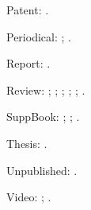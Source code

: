 \documentclass[a4paper,12pt]{report}
\begin{document}
Patent: \autocite{petroff:impurity}.

Periodical: \autocite{good:wholeissue}; \autocite{whittington:water}.

Report: \autocite{herwign:office}.

Review: \autocite{ac:comment:trad}; \autocite{bundy:macneil};
\autocite{Clemens:letter}; \autocite{kozinn:review};
\autocite{ratliff:review:15}; \autocite{wallraff:word}.

SuppBook: \autocite{friedman:intro}; \autocite{polakow:afterw};
\autocite{prose:intro}.

Thesis: \autocite{murphy:silent:15}.

Unpublished: \autocite{nass:address}.

Video: \autocite{cleese:holygrail}; \autocite{hitchcock:nbynw}.


\printbibliography[notkeyword=nosample,title=References]
\end{document}
